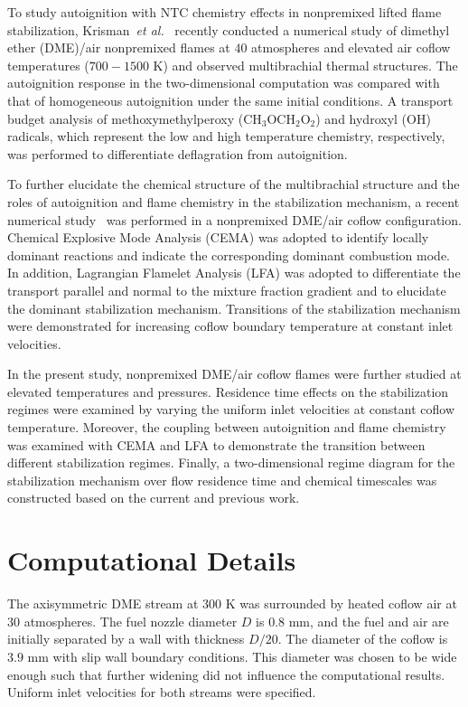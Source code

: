 \documentclass[review,3p,times]{elsarticle}
\begin{document}
To study autoignition with NTC chemistry effects in nonpremixed lifted flame stabilization, Krisman~\emph{et al.}~\cite{krisman14} recently conducted a numerical study of dimethyl ether (DME)/air nonpremixed flames at $40$ atmospheres and elevated air coflow temperatures ($700-1500$ K) and observed multibrachial thermal structures.  The autoignition response in the two-dimensional computation was compared with that of homogeneous autoignition under the same initial conditions.  A transport budget analysis of methoxymethylperoxy (CH$_3$OCH$_2$O$_2$) and hydroxyl (OH) radicals, which represent the low and high temperature chemistry, respectively, was performed to differentiate deflagration from autoignition.

To further elucidate the chemical structure of the multibrachial structure and the roles of autoignition and flame chemistry in the stabilization mechanism, a recent numerical study~\cite{deng15} was performed in a nonpremixed DME/air coflow configuration.  Chemical Explosive Mode Analysis (CEMA) was adopted to identify locally dominant reactions and indicate the corresponding dominant combustion mode.  In addition, Lagrangian Flamelet Analysis (LFA) was adopted to differentiate the transport parallel and normal to the mixture fraction gradient and to elucidate the dominant stabilization mechanism.  Transitions of the stabilization mechanism were demonstrated for increasing coflow boundary temperature at constant inlet velocities.

In the present study, nonpremixed DME/air coflow flames were further studied at elevated temperatures and pressures.  Residence time effects on the stabilization regimes were examined by varying the uniform inlet velocities at constant coflow temperature.  Moreover, the coupling between autoignition and flame chemistry was examined with CEMA and LFA to demonstrate the transition between different stabilization regimes.  Finally, a two-dimensional regime diagram for the stabilization mechanism over flow residence time and chemical timescales was constructed based on the current and previous work.    

 

\section{Computational Details} \label{sec:computation}

The axisymmetric DME stream at $300$ K was surrounded by heated coflow air at $30$ atmospheres.  The fuel nozzle diameter $D$ is $0.8$ mm, and the fuel and air are initially separated by a wall with thickness $D/20$.  The diameter of the coflow is $3.9$ mm with slip wall boundary conditions.  This diameter was chosen to be wide enough such that further widening did not influence the computational results.  Uniform inlet velocities for both streams were specified.
\end{document}
